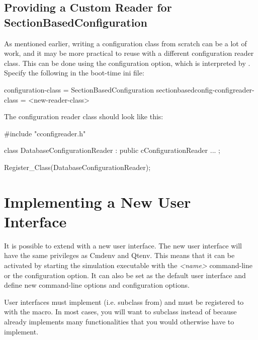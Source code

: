 \subsection{Providing a Custom Reader for SectionBasedConfiguration}
\label{sec:plugin-exts:custom-reader-for-sectionbasedconfiguration}

As mentioned earlier, writing a configuration class from scratch can
be a lot of work, and it may be more practical to reuse
 with a different configuration
reader class. This can be done using the 
configuration option, which is interpreted by .
Specify the following in the boot-time ini file:

\begin{inifile}
[General]
configuration-class = SectionBasedConfiguration
sectionbasedconfig-configreader-class = <new-reader-class>
\end{inifile}

The configuration reader class should look like this:

\begin{cpp}
#include "cconfigreader.h"

class DatabaseConfigurationReader : public cConfigurationReader
{
   ...
};

Register_Class(DatabaseConfigurationReader);
\end{cpp}


\section{Implementing a New User Interface}
\label{sec:plugin-exts:user-interface}

It is possible to extend {\opp} with a new user interface. The new user
interface will have the same privileges as Cmdenv and Qtenv. This means that it
can be activated by starting the simulation executable with the 
\textit{<name>} command-line or the  configuration
option. It can also be set as the default user interface and define new
command-line options and configuration options.

User interfaces must implement (i.e. subclass from)  and
must be registered to {\opp} with the  macro. In most
cases, you will want to subclass  instead of
 because  already implements many
functionalities that you would otherwise have to implement.

